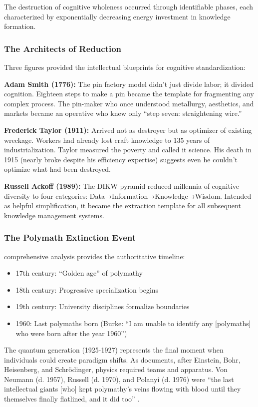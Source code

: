 The destruction of cognitive wholeness occurred through identifiable phases, each characterized by exponentially decreasing energy investment in knowledge formation.

\subsubsection{The Architects of Reduction}

Three figures provided the intellectual blueprints for cognitive standardization:

\textbf{Adam Smith (1776):} The pin factory model didn't just divide labor; it divided cognition. Eighteen steps to make a pin became the template for fragmenting any complex process. The pin-maker who once understood metallurgy, aesthetics, and markets became an operative who knew only ``step seven: straightening wire.''

\textbf{Frederick Taylor (1911):} Arrived not as destroyer but as optimizer of existing wreckage. Workers had already lost craft knowledge to 135 years of industrialization. Taylor measured the poverty and called it science. His death in 1915 (nearly broke despite his efficiency expertise) suggests even he couldn't optimize what had been destroyed.

\textbf{Russell Ackoff (1989):} The DIKW pyramid reduced millennia of cognitive diversity to four categories: Data→Information→Knowledge→Wisdom. Intended as helpful simplification, it became the extraction template for all subsequent knowledge management systems.

\subsubsection{The Polymath Extinction Event}

\citet{burke2020} comprehensive analysis provides the authoritative timeline:
\begin{itemize}
\item 17th century: ``Golden age'' of polymathy
\item 18th century: Progressive specialization begins
\item 19th century: University disciplines formalize boundaries
\item 1960: Last polymaths born (Burke: ``I am unable to identify any [polymaths] who were born after the year 1960'')
\end{itemize}

The quantum generation (1925-1927) represents the final moment when individuals could create paradigm shifts. As \citet{beller1996} documents, after Einstein, Bohr, Heisenberg, and Schrödinger, physics required teams and apparatus. Von Neumann (d. 1957), Russell (d. 1970), and Polanyi (d. 1976) were ``the last intellectual giants [who] kept polymathy's veins flowing with blood until they themselves finally flatlined, and it did too'' \citep{hoel2025}.

